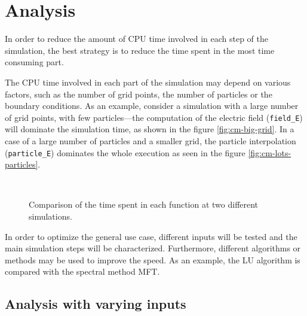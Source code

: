 \chapter{Analysis}



In order to reduce the amount of CPU time involved in each step of the 
simulation, the best strategy is to reduce the time spent in the most time 
consuming part.

The CPU time involved in each part of the simulation may depend on various 
factors, such as the number of grid points, the number of particles or the 
boundary conditions. As an example, consider a simulation with a large number of 
grid points, with few particles---the computation of the electric field 
(\texttt{field\_E}) will dominate the simulation time, as shown in the figure 
\ref{fig:cm-big-grid}. In a case of a large number of particles and a smaller 
grid, the particle interpolation (\texttt{particle\_E}) dominates the whole 
execution as seen in the figure \ref{fig:cm-lots-particles}.

\begin{figure}[h]
	\centering
	\\
	\caption{Comparison of the time spent in each function at two different 
	simulations.}
\end{figure}

In order to optimize the general use case, different inputs will be tested and 
the main simulation steps will be characterized. Furthermore, different 
algorithms or methods may be used to improve the speed. As an example, the LU 
algorithm is compared with the spectral method MFT.

\section{Analysis with varying inputs}

